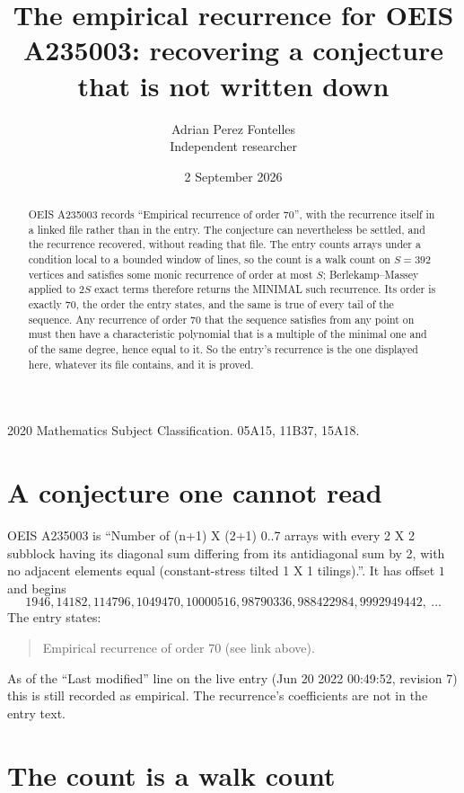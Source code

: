 \documentclass[11pt,a4paper]{article}
\title{The empirical recurrence for OEIS A235003: recovering a conjecture that is not written down}
\author{Adrian Perez Fontelles\\ \small Independent researcher}
\date{2 September 2026}
\theoremstyle{plain}
\theoremstyle{definition}
\begin{document}
\maketitle

\begin{abstract}
OEIS A235003 records ``Empirical recurrence of order $70$'', with the recurrence itself in a
linked file rather than in the entry. The conjecture can nevertheless be settled, and the
recurrence recovered, without reading that file. The entry counts arrays under a condition
local to a bounded window of lines, so the count is a walk count on $S=392$ vertices and
satisfies some monic recurrence of order at most $S$; Berlekamp--Massey applied to $2S$ exact
terms therefore returns the MINIMAL such recurrence. Its order is exactly $70$, the order
the entry states, and the same is true of every tail of the sequence. Any recurrence of order
$70$ that the sequence satisfies from any point on must then have a characteristic
polynomial that is a multiple of the minimal one and of the same degree, hence equal to it. So
the entry's recurrence is the one displayed here, whatever its file contains, and it is
proved.
\end{abstract}

\noindent\small 2020 Mathematics Subject Classification. 05A15, 11B37, 15A18.\normalsize

\section{A conjecture one cannot read}

OEIS A235003 is ``Number of (n+1) X (2+1) 0..7 arrays with every 2 X 2 subblock having its diagonal sum differing from its antidiagonal sum by 2, with no adjacent elements equal (constant-stress tilted 1 X 1 tilings).''. It has offset $1$ and begins
\[
1946, 14182, 114796, 1049470, 10000516, 98790336, 988422984, 9992949442,\ \dots
\]
The entry states:
\begin{quote}
Empirical recurrence of order 70 (see link above).
\end{quote}
As of the ``Last modified'' line on the live entry (Jun 20 2022 00:49:52, revision 7) this is still
recorded as empirical. The recurrence's coefficients are not in the entry text.

\section{The count is a walk count}
\end{document}
